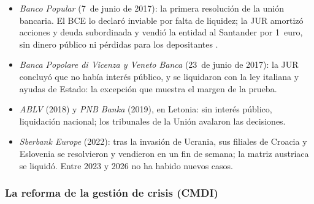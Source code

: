 \documentclass[11pt]{article}
\begin{document}
\begin{itemize}
\item \emph{Banco Popular} (7~de junio de 2017): la primera resolución de la unión bancaria. El BCE lo declaró inviable por falta de liquidez; la JUR amortizó acciones y deuda subordinada y vendió la entidad al Santander por 1~euro, sin dinero público ni pérdidas para los depositantes .
\item \emph{Banca Popolare di Vicenza y Veneto Banca} (23~de junio de 2017): la JUR concluyó que no había interés público, y se liquidaron con la ley italiana y ayudas de Estado: la excepción que muestra el margen de la prueba.
\item \emph{ABLV} (2018) y \emph{PNB Banka} (2019), en Letonia: sin interés público, liquidación nacional; los tribunales de la Unión avalaron las decisiones.
\item \emph{Sberbank Europe} (2022): tras la invasión de Ucrania, sus filiales de Croacia y Eslovenia se resolvieron y vendieron en un fin de semana; la matriz austriaca se liquidó. Entre 2023 y 2026 no ha habido nuevos casos\nocite{SRB2026Casos}.
\end{itemize}

\subsubsection{La reforma de la gestión de crisis (CMDI)}\label{sec:cmdi}
\end{document}

